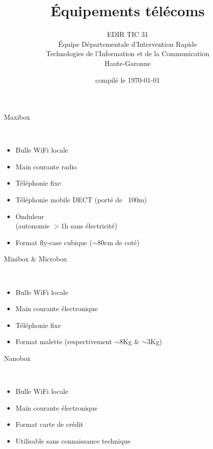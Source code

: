\documentclass{beamer}
\begin{document}
\date{compilé le \today}
\title{Équipements télécoms}
\author{
	EDIR TIC 31\\
	\small{
        Équipe Départementale d’Intervention Rapide\\
        Technologies de l’Information et de la Communication\\
        Haute-Garonne
    }
}

\begin{frame}
	\titlepage
\end{frame}

\begin{frame}
    \begin{huge}Maxibox\end{huge}
    \vspace{0.5cm}
    \\
    \begin{itemize}
        \item Bulle WiFi locale
        \item Main courante radio
        \item Téléphonie fixe
        \item Téléphonie mobile DECT (porté de ~100m)
        \item Onduleur \\ (autonomie $>$1h sans électricité)
        \item Format fly-case cubique ($\sim$80cm de coté)
    \end{itemize}
\end{frame}

\begin{frame}
    \begin{huge}Minibox \& Microbox\end{huge}
    \vspace{0.5cm}
    \\
    \begin{itemize}
        \item Bulle WiFi locale
        \item Main courante électronique
        \item Téléphonie fixe
        \item Format malette (respectivement $\sim$8Kg \& $\sim$3Kg)
    \end{itemize}
\end{frame}

\begin{frame}
    \begin{huge}Nanobox\end{huge}
    \vspace{0.5cm}
    \\
    \begin{itemize}
        \item Bulle WiFi locale
        \item Main courante électronique
        \item Format carte de crédit
        \item Utilisable sans connaissance technique
    \end{itemize}
\end{frame}
\end{document}
